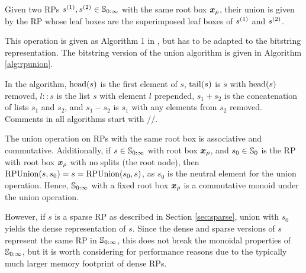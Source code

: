 \documentclass[../regular-pavings.tex]{subfiles}
\begin{document}
  
  Given two RPs $s ^{(1)}, s ^{(2)} \in \mathbb{S}_{0:\infty}$ with the same root box $\x_\rho$, 
  their union is given by the RP whose leaf boxes are 
  the superimposed leaf boxes of $s ^{(1)}$ and $s ^{(2)}$.

  This operation is given as Algorithm 1 in \cite{mrp-raaz-harlow-tucker}, 
  but has to be adapted to the bitstring representation.
  The bitstring version of the union algorithm is given in Algorithm \ref{alg:rpunion}.

  In the algorithm, ${\mathop{\rm head}}(s)$ is the first element of $s$, 
  ${\mathop{\rm tail}}(s)$ is $s$ with ${\mathop{\rm head}}(s)$ removed,
  $l :: s$ is the list $s$ with element $l$ prepended,
  $s_1 + s_2$ is the concatenation of lists $s_1$ and $s_2$, and 
  $s_1 - s_2$ is $s_1$ with any elements from $s_2$ removed.
  Comments in all algorithms start with //.

  The union operation on RPs with the same root box is associative and commutative.
  Additionally, if $s \in \mathbb{S}_{0:\infty}$ with root box $\x_\rho$, and 
  $s_0 \in \mathbb{S}_0$ is the RP with root box $\x_\rho$ with no splits (the root node),
  then $\mathrm{RPUnion}(s, s_0) = s = \mathrm{RPUnion}(s_0, s)$, as 
  $s_0$ is the neutral element for the union operation.
  Hence, $\mathbb{S}_{0:\infty}$ with a fixed root box $\x_\rho$
  is a commutative monoid under the union operation.
  
  However, if $s$ is a sparse RP as described in Section \ref{sec:sparse}, 
  union with $s_0$ yields the dense representation of $s$.
  Since the dense and sparse versions of $s$ represent the same RP in $\mathbb{S}_{0:\infty}$, 
  this does not break the monoidal properties of $\mathbb{S}_{0:\infty}$,
  but it is worth considering for performance reasons due to 
  the typically much larger memory footprint of dense RPs.
\end{document}
